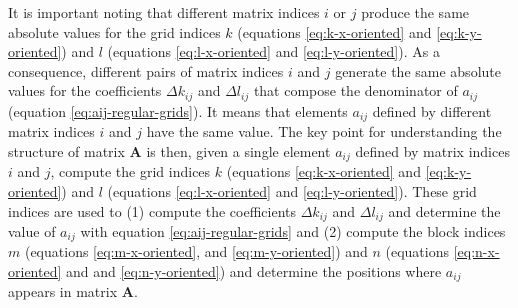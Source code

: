 \documentclass[manuscript,revised]{geophysics}
\begin{document}
It is important noting that different matrix indices $i$ or $j$ produce the same 
absolute values for the grid indices $k$ (equations \ref{eq:k-x-oriented} and
\ref{eq:k-y-oriented}) and $l$ (equations \ref{eq:l-x-oriented} and
\ref{eq:l-y-oriented}). As a consequence, different pairs of matrix indices $i$
and $j$ generate the same absolute values for the coefficients $\Delta k_{ij}$ and
$\Delta l_{ij}$ that compose the denominator of $a_{ij}$ 
(equation \ref{eq:aij-regular-grids}). It means that elements $a_{ij}$ defined
by different matrix indices $i$ and $j$ have the same value. The key point for
understanding the structure of matrix $\mathbf{A}$ is then, given a single element $a_{ij}$
defined by matrix indices $i$ and $j$, compute the grid indices 
$k$ (equations \ref{eq:k-x-oriented} and \ref{eq:k-y-oriented}) and
$l$ (equations \ref{eq:l-x-oriented} and \ref{eq:l-y-oriented}).
These grid indices are used to 
(1) compute the coefficients $\Delta k_{ij}$ and 
$\Delta l_{ij}$ and determine the value of $a_{ij}$ with equation 
\ref{eq:aij-regular-grids} and 
(2) compute the block indices $m$ (equations \ref{eq:m-x-oriented}, 
and \ref{eq:m-y-oriented}) and $n$ (equations \ref{eq:n-x-oriented} and
and \ref{eq:n-y-oriented}) and determine the positions where $a_{ij}$ appears
in matrix $\mathbf{A}$.
\end{document}
